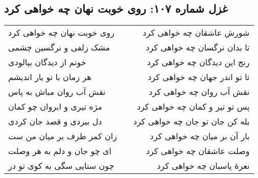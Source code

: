 \begin{center}
\section*{غزل شماره ۱۰۷: روی خوبت نهان چه خواهی کرد}
\label{sec:107}
\begin{longtable}{l p{0.5cm} r}
روی خوبت نهان چه خواهی کرد
&&
شورش عاشقان چه خواهی کرد
\\
مشک زلفی و نرگسین چشمی
&&
تا بدان نرگسان چه خواهی کرد
\\
خونم از دیدگان بپالودی
&&
رنج این دیدگان چه خواهی کرد
\\
هر زمان با تو یار اندیشم
&&
تا تو اندر جهان چه خواهی کرد
\\
نقش آب روان مباش به پاس
&&
نقش آب روان چه خواهی کرد
\\
مژه تیری و ابروان چو کمان
&&
پس تو تیر و کمان چه خواهی کرد
\\
دل ببردی و قصد جان کردی
&&
یله کن جان تو جان چه خواهی کرد
\\
زان کمر طرف بر میان من ست
&&
بار آن بر میان چه خواهی کرد
\\
ای چو جان و دلم به هر وصلت
&&
وصلت عاشقان چه خواهی کرد
\\
چون سنایی سگی به کوی تو در
&&
نعرهٔ پاسبان چه خواهی کرد
\\
\end{longtable}
\end{center}

